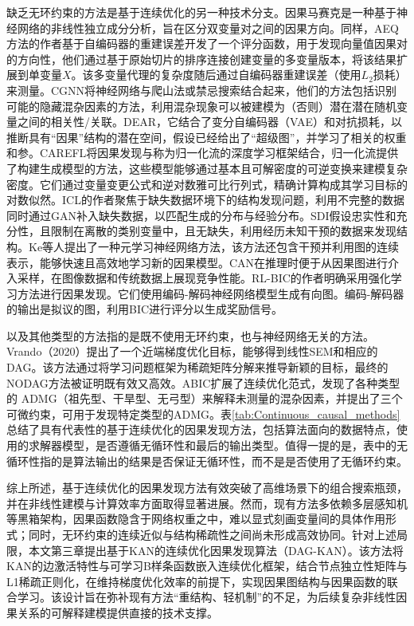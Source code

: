 缺乏无环约束的方法是基于连续优化的另一种技术分支。因果马赛克\cite{Wu2020}是一种基于神经网络的非线性独立成分分析，旨在区分双变量对之间的因果方向。同样，AEQ方法\cite{Galanti2020}的作者基于自编码器的重建误差开发了一个评分函数，用于发现向量值因果对的方向性，他们通过基于原始切片的排序连接创建变量的多变量版本，将该结果扩展到单变量$X$。该多变量代理的复杂度随后通过自编码器重建误差（使用$L_2$损耗）来测量。CGNN\cite{Goudet2018}将神经网络与爬山法或禁忌搜索结合起来，他们的方法包括识别可能的隐藏混杂因素的方法，利用混杂现象可以被建模为（否则）潜在潜在随机变量之间的相关性/关联。DEAR\cite{Shen2020}，它结合了变分自编码器（VAE）\cite{Kingma2013,Rezende2014}和对抗损耗\cite{Goodfellow2014}，以推断具有“因果”结构的潜在空间，假设已经给出了“超级图”，并学习了相关的权重和参。CAREFL\cite{Khemakhem2021}将因果发现与称为归一化流的深度学习框架结合，归一化流提供了构建生成模型的方法，这些模型能够通过基本且可解密度的可逆变换来建模复杂密度。它们通过变量变更公式和逆对数雅可比行列式，精确计算构成其学习目标的对数似然。ICL\cite{Wang2020}的作者聚焦于缺失数据环境下的结构发现问题，利用不完整的数据同时通过GAN补入缺失数据，以匹配生成的分布与经验分布。SDI\cite{Ke2019}假设忠实性和充分性，且限制在离散的类别变量中，且无缺失，利用经历未知干预的数据来发现结构。Ke等人\cite{Ke2020}提出了一种元学习神经网络方法，该方法还包含干预并利用图的连续表示，能够快速且高效地学习新的因果模型。CAN\cite{Moraffah2020}在推理时便于从因果图进行介入采样，在图像数据和传统数据上展现竞争性能。RL-BIC的作者\cite{Zhu2019}明确采用强化学习方法进行因果发现。它们使用编码\mbox{-}解码神经网络模型生成有向图。编码\mbox{-}解码器的输出是拟议的图，利用BIC进行评分以生成奖励信号。

以及其他类型的方法指的是既不使用无环约束，也与神经网络无关的方法。Vrando（2020）\cite{Varando2020}提出了一个近端梯度优化目标，能够得到线性SEM和相应的DAG。该方法通过将学习问题框架为稀疏矩阵分解来推导新颖的目标，最终的NODAG方法被证明既有效又高效。ABIC\cite{Bhattacharya2021}扩展了连续优化范式，发现了各种类型的 ADMG（祖先型、干旱型、无弓型）来解释未测量的混杂因素，并提出了三个可微约束，可用于发现特定类型的ADMG。表\ref{tab:Continuous_causal_methods}总结了具有代表性的基于连续优化的因果发现方法，包括算法面向的数据特点，使用的求解器模型，是否遵循无循环性和最后的输出类型。值得一提的是，表中的无循环性指的是算法输出的结果是否保证无循环性，而不是是否使用了无循环约束。

综上所述，基于连续优化的因果发现方法有效突破了高维场景下的组合搜索瓶颈，并在非线性建模与计算效率方面取得显著进展。然而，现有方法多依赖多层感知机等黑箱架构，因果函数隐含于网络权重之中，难以显式刻画变量间的具体作用形式；同时，无环约束的连续近似与结构稀疏性之间尚未形成高效协同。针对上述局限，本文第三章提出基于KAN的连续优化因果发现算法（DAG-KAN）。该方法将KAN的边激活特性与可学习B样条函数嵌入连续优化框架，结合节点独立性矩阵与L1稀疏正则化，在维持梯度优化效率的前提下，实现因果图结构与因果函数的联合学习。该设计旨在弥补现有方法“重结构、轻机制”的不足，为后续复杂非线性因果关系的可解释建模提供直接的技术支撑。


